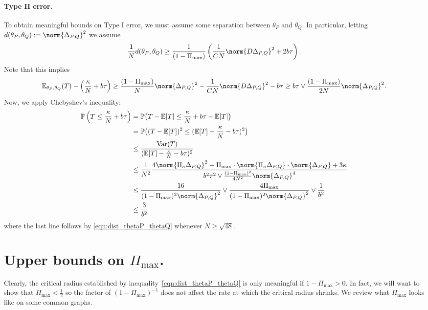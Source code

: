 \documentclass{article}
\newcommand{\Var}{\mathrm{Var}}
\newcommand{\1}{\mathbf{1}}
\newcommand{\Pbb}{\mathbb{P}}
\newcommand{\Ebb}{\mathbb{E}}
\theoremstyle{alden}
\theoremstyle{aldenthm}
\theoremstyle{definition}
\theoremstyle{remark}
\begin{document}
\paragraph{Type II error.}
To obtain meaningful bounds on Type I error, we must assume some separation between $\theta_P$ and $\theta_Q$. In particular, letting $d(\theta_P,\theta_Q) := \norm{\Delta_{P,Q}}^2$ we assume
\begin{equation}
\label{eqn:dist_thetaP_thetaQ}
\frac{1}{N}d(\theta_P,\theta_Q) \geq \frac{1}{(1 - \Pi_{\max})} \left(\frac{1}{CN}\norm{D \Delta_{P,Q}}^2 + 2b\tau\right).
\end{equation}
Note that this implies
\begin{equation*}
\mathbb{E}_{\theta_P,\theta_Q}(T) - \left(\frac{\kappa}{N} + b\tau\right) \geq \frac{(1 - \Pi_{\max})}{N} \norm{\Delta_{P,Q}}^2 - \frac{1}{CN}\norm{D \Delta_{P,Q}}^2 - b\tau \geq b\tau \vee \frac{(1 - \Pi_{\max})}{2N} \norm{\Delta_{P,Q}}^2.
\end{equation*}
Now, we apply Chebyshev's inequality:
\begin{align*}
\Pbb\left(T \leq \frac{\kappa}{N} + b\tau\right) & = \Pbb\bigl(T - \Ebb[T] \leq \frac{\kappa}{N} + b\tau - \Ebb[T]\bigr) \\
& = \Pbb\bigl( (T - \Ebb[T])^2 \leq (\Ebb[T] - \frac{\kappa}{N} - b\tau)^2 \bigr) \\
& \leq \frac{\Var(T)}{(\Ebb[T] - \frac{\kappa}{N} - b\tau)^2} \\
& \leq \frac{1}{N^2}\frac{4\norm{\Pi_{\kappa} \Delta_{P,Q}}^2 + \Pi_{\max} \cdot \norm{\Pi_{\kappa} \Delta_{P,Q}} \cdot \norm{\Delta_{P,Q}} + 3\kappa}{b^2\tau^2 \vee \frac{(1 - \Pi_{\max})^2}{4N^2} \norm{\Delta_{P,Q}}^4} \\
& \leq \frac{16}{(1 - \Pi_{\max})^2 \norm{\Delta_{P,Q}}^2} \vee \frac{4\Pi_{\max}}{(1 - \Pi_{\max})^2 \norm{\Delta_{P,Q}}^2} \vee \frac{1}{b^2} \\
& \leq \frac{3}{b^2}
\end{align*}
where the last line follows by \eqref{eqn:dist_thetaP_thetaQ} whenever $N \geq \sqrt{48}$. 

\section{Upper bounds on $\Pi_{\max}$.}
Clearly, the critical radius established by inequality~\eqref{eqn:dist_thetaP_thetaQ} is only meaningful if $1 - \Pi_{\max} > 0$. In fact, we will want to show that $\Pi_{\max} < \frac{1}{2}$ so the factor of $(1 - \Pi_{\max})^{-1}$ does not affect the rate at which the critical radius shrinks. We review what $\Pi_{\max}$ looks like on some common graphs.
\end{document}
